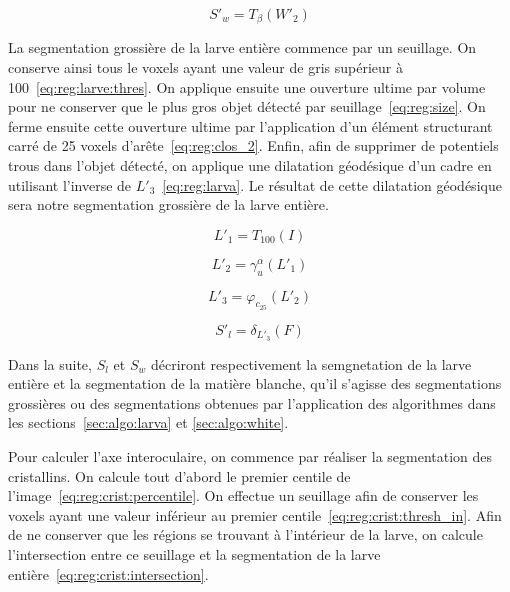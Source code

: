 \documentclass[\main/main.tex]{subfiles}
\begin{document}
\begin{equation}
    \label{eq:reg:white}
    S'_w = T_{\beta}(W'_2)
\end{equation}

%
La segmentation grossière de la larve entière commence par un seuillage.
%
On conserve ainsi tous le voxels ayant une valeur de gris supérieur à 100~\eqref{eq:reg:larve:thres}.
%
On applique ensuite une ouverture ultime par volume pour ne conserver que le plus gros objet détecté par seuillage~\eqref{eq:reg:size}.
%
On ferme ensuite cette ouverture ultime par l'application d'un élément structurant carré de 25 voxels d'arête~\eqref{eq:reg:clos_2}.
%
Enfin, afin de supprimer de potentiels trous dans l'objet détecté, on applique une dilatation géodésique d'un cadre en utilisant l'inverse de $L'_3$~\eqref{eq:reg:larva}.
%
Le résultat de cette dilatation géodésique sera notre segmentation grossière de la larve entière.

\begin{equation}
    \label{eq:reg:larve:thresh}
    L'_{1} = T_{100}(I)
\end{equation}

\begin{equation}
\label{eq:white:open_volume}
    L'_{2} = \gamma^{\alpha}_{u}(L'_1)
\end{equation}

\begin{equation}
    \label{eq:reg:clos_2}
    L'_{3} = \varphi_{c_25}(L'_2)
\end{equation}

\begin{equation}
    \label{eq:reg:larva}
    S'_l = \delta_{L'_3}(F)
\end{equation}

%
Dans la suite, $S_l$ et $S_w$ décriront respectivement la semgnetation de la larve entière et la segmentation de la matière blanche, qu'il s'agisse des segmentations grossières ou des segmentations obtenues par l'application des algorithmes dans les sections~\ref{sec:algo:larva} et \ref{sec:algo:white}.

%
Pour calculer l'axe interoculaire, on commence par réaliser la segmentation des cristallins.
%
On calcule tout d'abord le premier centile de l'image~\eqref{eq:reg:crist:percentile}.
%
On effectue un seuillage afin de conserver les voxels ayant une valeur inférieur au premier centile~\eqref{eq:reg:crist:thresh_in}.
%
Afin de ne conserver que les régions se trouvant à l'intérieur de la larve, on calcule l'intersection entre ce seuillage et la segmentation de la larve entière~\eqref{eq:reg:crist:intersection}.
%
\end{document}
